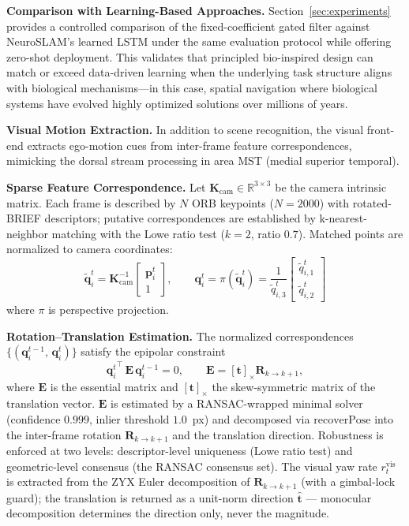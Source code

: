 \textbf{Comparison with Learning-Based Approaches.} Section~\ref{sec:experiments} provides a controlled comparison of the fixed-coefficient gated filter against NeuroSLAM's learned LSTM under the same evaluation protocol while offering zero-shot deployment. This validates that principled bio-inspired design can match or exceed data-driven learning when the underlying task structure aligns with biological mechanisms---in this case, spatial navigation where biological systems have evolved highly optimized solutions over millions of years.

\textbf{Visual Motion Extraction.} In addition to scene recognition, the visual front-end extracts ego-motion cues from inter-frame feature correspondences, mimicking the dorsal stream processing in area MST (medial superior temporal).

\textbf{Sparse Feature Correspondence.} Let $\mathbf{K}_{\mathrm{cam}}\in\mathbb{R}^{3\times 3}$ be the camera intrinsic matrix. Each frame is described by $N$ ORB keypoints ($N{=}2000$) with rotated-BRIEF descriptors; putative correspondences are established by k-nearest-neighbor matching with the Lowe ratio test ($k{=}2$, ratio $0.7$). Matched points are normalized to camera coordinates:
\begin{equation}
    \tilde{\mathbf{q}}_i^t = \mathbf{K}_{\mathrm{cam}}^{-1}\begin{bmatrix}\mathbf{p}_i^t\\ 1\end{bmatrix},\qquad \mathbf{q}_i^t = \pi(\tilde{\mathbf{q}}_i^t)=\frac{1}{\tilde{q}_{i,3}^t}\begin{bmatrix}\tilde{q}_{i,1}^t\\ \tilde{q}_{i,2}^t\end{bmatrix}
\end{equation}
where $\pi$ is perspective projection.

\textbf{Rotation--Translation Estimation.} The normalized correspondences $\{(\mathbf{q}_i^{t-1},\,\mathbf{q}_i^{t})\}$ satisfy the epipolar constraint
\begin{equation}
    {\mathbf{q}_i^{t}}^{\top}\,\mathbf{E}\,\mathbf{q}_i^{t-1}=0,\qquad \mathbf{E}=[\mathbf{t}]_{\times}\mathbf{R}_{k\to k+1},
\end{equation}
where $\mathbf{E}$ is the essential matrix and $[\mathbf{t}]_{\times}$ the skew-symmetric matrix of the translation vector. $\mathbf{E}$ is estimated by a RANSAC-wrapped minimal solver (confidence $0.999$, inlier threshold $1.0$~px) and decomposed via $\mathrm{recoverPose}$ into the inter-frame rotation $\mathbf{R}_{k\to k+1}$ and the translation direction. Robustness is enforced at two levels: descriptor-level uniqueness (Lowe ratio test) and geometric-level consensus (the RANSAC consensus set). The visual yaw rate $r_t^{\mathrm{vis}}$ is extracted from the ZYX Euler decomposition of $\mathbf{R}_{k\to k+1}$ (with a gimbal-lock guard); the translation is returned as a unit-norm direction $\hat{\mathbf{t}}$ --- monocular decomposition determines the direction only, never the magnitude.


